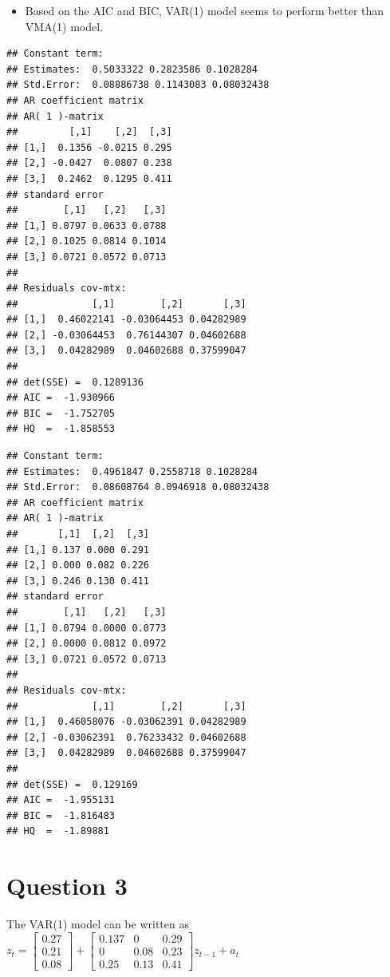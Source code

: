 \documentclass[]{article}
\providecommand{\tightlist}{%
  \setlength{\itemsep}{0pt}\setlength{\parskip}{0pt}}
\begin{document}
\begin{itemize}
\tightlist
\item
  Based on the AIC and BIC, VAR(1) model seems to perform better than
  VMA(1) model.
\end{itemize}

\begin{verbatim}
## Constant term: 
## Estimates:  0.5033322 0.2823586 0.1028284 
## Std.Error:  0.08886738 0.1143083 0.08032438 
## AR coefficient matrix 
## AR( 1 )-matrix 
##         [,1]    [,2]  [,3]
## [1,]  0.1356 -0.0215 0.295
## [2,] -0.0427  0.0807 0.238
## [3,]  0.2462  0.1295 0.411
## standard error 
##        [,1]   [,2]   [,3]
## [1,] 0.0797 0.0633 0.0788
## [2,] 0.1025 0.0814 0.1014
## [3,] 0.0721 0.0572 0.0713
##   
## Residuals cov-mtx: 
##             [,1]        [,2]       [,3]
## [1,]  0.46022141 -0.03064453 0.04282989
## [2,] -0.03064453  0.76144307 0.04602688
## [3,]  0.04282989  0.04602688 0.37599047
##   
## det(SSE) =  0.1289136 
## AIC =  -1.930966 
## BIC =  -1.752705 
## HQ  =  -1.858553
\end{verbatim}

\begin{verbatim}
## Constant term: 
## Estimates:  0.4961847 0.2558718 0.1028284 
## Std.Error:  0.08608764 0.0946918 0.08032438 
## AR coefficient matrix 
## AR( 1 )-matrix 
##       [,1]  [,2]  [,3]
## [1,] 0.137 0.000 0.291
## [2,] 0.000 0.082 0.226
## [3,] 0.246 0.130 0.411
## standard error 
##        [,1]   [,2]   [,3]
## [1,] 0.0794 0.0000 0.0773
## [2,] 0.0000 0.0812 0.0972
## [3,] 0.0721 0.0572 0.0713
##   
## Residuals cov-mtx: 
##             [,1]        [,2]       [,3]
## [1,]  0.46058076 -0.03062391 0.04282989
## [2,] -0.03062391  0.76233432 0.04602688
## [3,]  0.04282989  0.04602688 0.37599047
##   
## det(SSE) =  0.129169 
## AIC =  -1.955131 
## BIC =  -1.816483 
## HQ  =  -1.89881
\end{verbatim}

\section{Question 3}\label{question-3}

The VAR(1) model can be written as
\(z_{t} = \left[\begin{array}{ccc}0.27 \\ 0.21 \\ 0.08\end{array}\right] + \left[\begin{array}{rrr}0.137 & 0 & 0.29 \\0 & 0.08 & 0.23 \\0.25 & 0.13 & 0.41\end{array}\right]z_{t-1} + a_{t}\)
\end{document}
